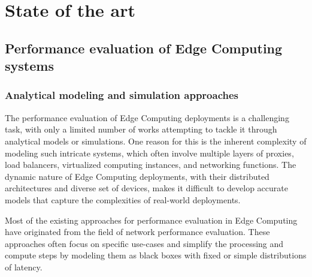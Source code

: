 \section{State of the art}

\subsection{Performance evaluation of Edge Computing systems}


\subsubsection{Analytical modeling and simulation approaches}

The performance evaluation of Edge Computing deployments is a challenging task, with only a limited number of works attempting to tackle it through analytical models or simulations.
One reason for this is the inherent complexity of modeling such intricate systems, which often involve multiple layers of proxies, load balancers, virtualized computing instances, and networking functions.
The dynamic nature of Edge Computing deployments, with their distributed architectures and diverse set of devices, makes it difficult to develop accurate models that capture the complexities of real-world deployments.

Most of the existing approaches for performance evaluation in Edge Computing have originated from the field of network performance evaluation.
These approaches often focus on specific use-cases and simplify the processing and compute steps by modeling them as black boxes with fixed or simple distributions of latency.









